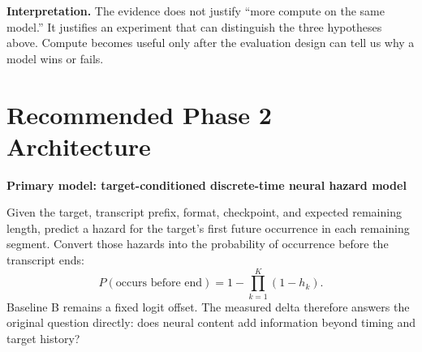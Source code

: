 \documentclass[10pt,a4paper]{article}
\begin{document}
\vspace{5mm}
\begin{keybox}
  \textbf{Interpretation.}
  The evidence does not justify ``more compute on the same model.'' It justifies an
  experiment that can distinguish the three hypotheses above. Compute becomes useful
  only after the evaluation design can tell us why a model wins or fails.
\end{keybox}

\clearpage

\section{Recommended Phase 2 Architecture}

\begin{plainbox}
  \textbf{Primary model: target-conditioned discrete-time neural hazard model}\par
  Given the target, transcript prefix, format, checkpoint, and expected remaining
  length, predict a hazard for the target's first future occurrence in each remaining
  segment. Convert those hazards into the probability of occurrence before the
  transcript ends:
  \[
    P(\text{occurs before end}) =
    1 - \prod_{k=1}^{K}\left(1-h_k\right).
  \]
  Baseline B remains a fixed logit offset. The measured delta therefore answers the
  original question directly: does neural content add information beyond timing and
  target history?
\end{plainbox}
\end{document}
